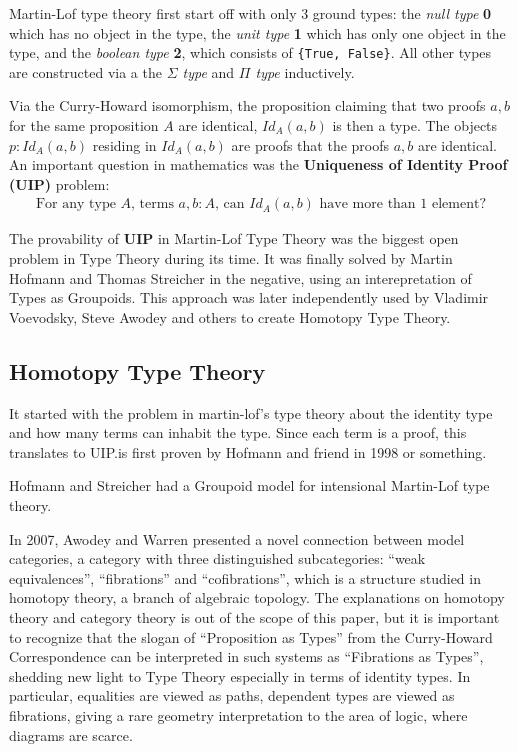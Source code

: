 \documentclass[acmsmall]{acmart}
\begin{document}
Martin-Lof type theory first start off with only 3 ground types: the \emph{null
  type} \textbf{0} which has no object in the type, the \emph{unit type}
\textbf{1} which has only one object in the type, and the \emph{boolean type}
\textbf{2}, which consists of \verb|{True, False}|. All other types are
constructed via a the \emph{$\Sigma$ type} and \emph{$\Pi$ type} inductively.

Via the Curry-Howard isomorphism, the proposition claiming that two proofs $a,b$
for the same proposition $A$ are identical, $Id_{A}(a,b)$ is then a type. The
objects $p: Id_{A}(a,b)$ residing in $Id_{A}(a,b)$ are proofs that the proofs
$a,b$ are identical. An important question in mathematics was the
\textbf{Uniqueness of Identity Proof (UIP)} problem:
\begin{align*}
  \text{For any type $A$, terms $a,b:A$, can $Id_{A}(a,b)$ have more than $1$ element?}
\end{align*}

The provability of \textbf{UIP} in Martin-Lof Type Theory was the biggest open problem in
Type Theory during its time. It was finally solved by Martin Hofmann and Thomas
Streicher\cite{hofmann1998groupoid} in the negative, using an interepretation of
Types as Groupoids. This approach was later independently used by Vladimir
Voevodsky, Steve Awodey and others to create Homotopy Type Theory.

\subsection{Homotopy Type Theory}

It started with the problem in martin-lof's type theory about the identity type
and how many terms can inhabit the type. Since each term is a proof, this
translates to UIP.\@This is first proven by Hofmann and friend in 1998 or
something.

Hofmann and Streicher had a Groupoid model for intensional Martin-Lof type
theory.

In 2007, Awodey and Warren presented a novel connection between model
categories, a category with three distinguished subcategories: ``weak
equivalences'', ``fibrations'' and ``cofibrations'', which is a structure
studied in homotopy theory, a branch of algebraic topology. The explanations on
homotopy theory and category theory is out of the scope of this paper, but it is
important to recognize that the slogan of ``Proposition as Types'' from the
Curry-Howard Correspondence can be interpreted in such systems as ``Fibrations
as Types'', shedding new light to Type Theory especially in terms of identity
types. In particular, equalities are viewed as paths, dependent types are viewed
as fibrations, giving a rare geometry interpretation to the area of logic, where
diagrams are scarce.
\end{document}
